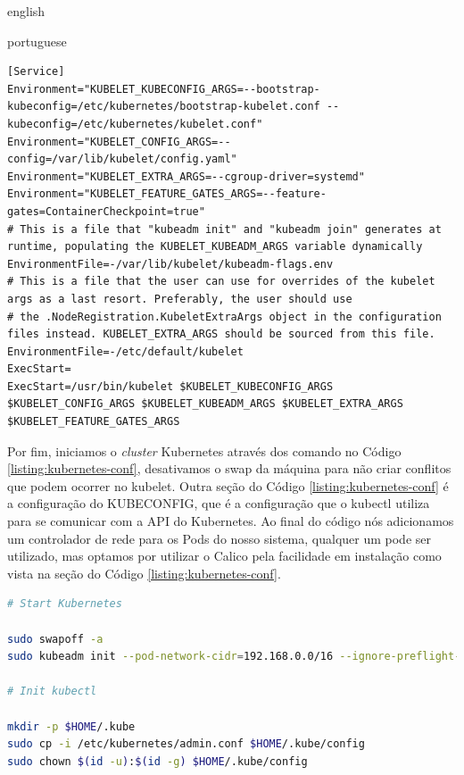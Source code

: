 \begin{otherlanguage*}{english}
\begin{otherlanguage*}{portuguese}
\begin{lstlisting}[language=plaintext,caption={Configuração do kubelet para executar no systemd com Feature Flag de ContainerCheckpoint e cgroup do systemd.},label={listing:kubelet-conf}]
[Service]
Environment="KUBELET_KUBECONFIG_ARGS=--bootstrap-kubeconfig=/etc/kubernetes/bootstrap-kubelet.conf --kubeconfig=/etc/kubernetes/kubelet.conf"
Environment="KUBELET_CONFIG_ARGS=--config=/var/lib/kubelet/config.yaml"
Environment="KUBELET_EXTRA_ARGS=--cgroup-driver=systemd"
Environment="KUBELET_FEATURE_GATES_ARGS=--feature-gates=ContainerCheckpoint=true"
# This is a file that "kubeadm init" and "kubeadm join" generates at runtime, populating the KUBELET_KUBEADM_ARGS variable dynamically
EnvironmentFile=-/var/lib/kubelet/kubeadm-flags.env
# This is a file that the user can use for overrides of the kubelet args as a last resort. Preferably, the user should use
# the .NodeRegistration.KubeletExtraArgs object in the configuration files instead. KUBELET_EXTRA_ARGS should be sourced from this file.
EnvironmentFile=-/etc/default/kubelet
ExecStart=
ExecStart=/usr/bin/kubelet $KUBELET_KUBECONFIG_ARGS $KUBELET_CONFIG_ARGS $KUBELET_KUBEADM_ARGS $KUBELET_EXTRA_ARGS $KUBELET_FEATURE_GATES_ARGS
\end{lstlisting}

Por fim, iniciamos o \textit{cluster} Kubernetes através dos comando no Código
\ref{listing:kubernetes-conf}, desativamos o swap da máquina para não criar conflitos que podem
ocorrer no kubelet. Outra seção do Código \ref{listing:kubernetes-conf} é a configuração do
KUBECONFIG, que é a configuração que o kubectl utiliza para se comunicar com a API do Kubernetes.
Ao final do código nós adicionamos um controlador de rede para os Pods do nosso sistema, qualquer
um pode ser utilizado, mas optamos por utilizar o Calico \cite{calico} pela facilidade em
instalação como vista na seção do Código \ref{listing:kubernetes-conf}.

\begin{lstlisting}[language=bash,caption={Inicialização do Kubernetes, configuração de acesso para o kubectl e instalação do administrador de rede para Pods Calico.},label={listing:kubernetes-conf}]
# Start Kubernetes

sudo swapoff -a
sudo kubeadm init --pod-network-cidr=192.168.0.0/16 --ignore-preflight-errors='all'

# Init kubectl

mkdir -p $HOME/.kube
sudo cp -i /etc/kubernetes/admin.conf $HOME/.kube/config
sudo chown $(id -u):$(id -g) $HOME/.kube/config


\end{lstlisting}
\end{otherlanguage*}
\end{otherlanguage*}
